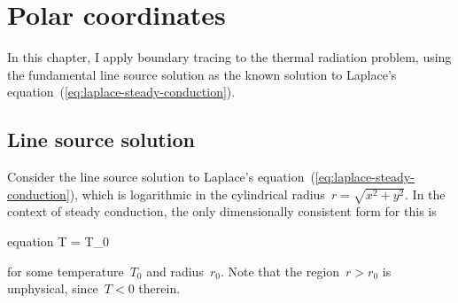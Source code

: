 \chapter{Polar coordinates}
\label{ch:polar}

In this chapter, I apply boundary tracing to the thermal radiation problem,
using the fundamental line source solution
as the known solution to
Laplace's equation~(\ref{eq:laplace-steady-conduction}).

\section{Line source solution}
\label{sec:polar.line}

Consider the line source solution
to Laplace's equation~(\ref{eq:laplace-steady-conduction}),
which is logarithmic in the cylindrical radius~$r = \sqrt{x^2 + y^2}$.
In the context of steady conduction,
the only dimensionally consistent form for this is
\begin{important}{equation}
  T = T_0 \log {}
  \label{eq:line-laplace-solution}
\end{important}
for some temperature~$T_0$ and radius~$r_0$.
Note that the region~$r > r_0$ is unphysical,
since~$T < 0$ therein.
